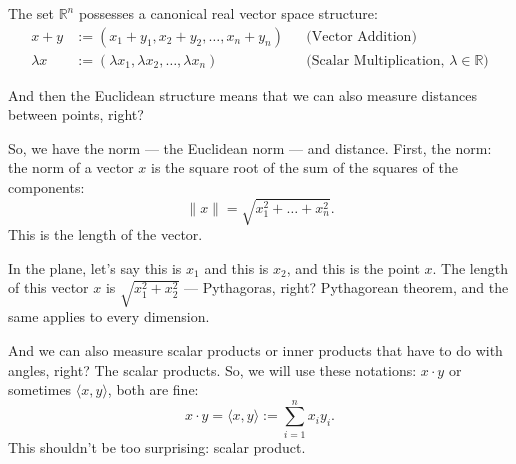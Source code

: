 \begin{math-stroke}
\end{math-stroke}

\begin{math-stroke}
The set $\mathbb{R}^n$ possesses a canonical real vector space structure:
\begin{align}
x + y &:= (x_1 + y_1, x_2 + y_2, \dots, x_n + y_n) && \text{(Vector Addition)} \label{eq:vector-addition} \\
\lambda x &:= (\lambda x_1, \lambda x_2, \dots, \lambda x_n) && \text{(Scalar Multiplication, } \lambda \in \mathbb{R}\text{)} \label{eq:scalar-multiplication}
\end{align}
\end{math-stroke}

\begin{spoken-clean}[00:47:19 - 00:50:09]
And then the Euclidean structure means that we can also measure distances between points, right?

So, we have the norm --- the Euclidean norm --- and distance. First, the norm: the norm of a vector $x$ is the square root of the sum of the squares of the components:
\[
\|x\| = \sqrt{x_1^2 + \dots + x_n^2}.
\]
This is the length of the vector.

In the plane, let's say this is $x_1$ and this is $x_2$, and this is the point $x$. The length of this vector $x$ is $\sqrt{x_1^2 + x_2^2}$ --- Pythagoras, right? Pythagorean theorem, and the same applies to every dimension.

And we can also measure scalar products or inner products that have to do with angles, right? The scalar products. So, we will use these notations: $x \cdot y$ or sometimes $\langle x, y \rangle$, both are fine:
\[
x \cdot y = \langle x, y \rangle := \sum_{i=1}^n x_i y_i.
\]
This shouldn't be too surprising: scalar product.
\end{spoken-clean}

